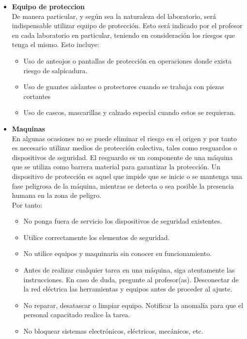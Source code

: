 \documentclass[12pt,letterpaper]{report}
\begin{document}
\begin{itemize}
\item \textbf{Equipo de proteccion}\\
De manera particular, y según sea la naturaleza del laboratorio, será indispensable
utilizar equipo de protección.
Esto será indicado por el profesor en cada laboratorio en particular, teniendo en
consideración los riesgos que tenga el mismo.
Esto incluye:
\begin{itemize}
\item Uso de anteojos o pantallas de protección en operaciones donde exista
riesgo de salpicadura.
\item Uso de guantes aislantes o protectores cuando se trabaja con piezas
cortantes
\item Uso de cascos, mascarillas y calzado especial cuando estos se
requieran.
\end{itemize}
\item \textbf{Maquinas}\\
En algunas ocasiones no se puede eliminar el riesgo en el origen y por tanto es
necesario utilizar medios de protección colectiva, tales como resguardos o
dispositivos de seguridad.
El resguardo es un componente de una máquina que se utiliza como barrera
material para garantizar la protección.
Un dispositivo de protección es aquel que impide que se inicie o se mantenga una
fase peligrosa de la máquina, mientras se detecta o sea posible la presencia
humana en la zona de peligro.\\
Por tanto:
\begin{itemize}
\item No ponga fuera de servicio los dispositivos de seguridad existentes.
\item Utilice correctamente los elementos de seguridad.
\item No utilice equipos y maquinaria sin conocer su funcionamiento.
\item Antes de realizar cualquier tarea en una máquina, siga atentamente
las instrucciones. En caso de duda, pregunte al profesor(as).
Desconectar de la red eléctrica las herramientas y equipos antes de
proceder al ajuste.
\item No reparar, desatascar o limpiar equipo. Notificar la anomalía para
que el personal capacitado realice la tarea.
\item No bloquear sistemas electrónicos, eléctricos, mecánicos, etc.
\end{itemize}
\end{itemize}







\end{document}
